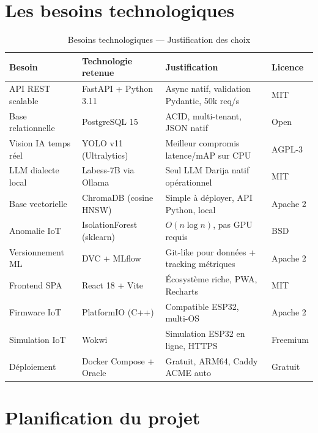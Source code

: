\section{Les besoins technologiques}

\begin{table}[H]\centering
\caption{Besoins technologiques — Justification des choix}
\label{tab:tech_needs}
\small
\begin{tabular}{lp{3.5cm}p{4cm}l}
\toprule
\textbf{Besoin} & \textbf{Technologie retenue} & \textbf{Justification} & \textbf{Licence} \\
\midrule
API REST scalable    & FastAPI + Python 3.11   & Async natif, validation Pydantic, 50k req/s & MIT \\
Base relationnelle   & PostgreSQL 15           & ACID, multi-tenant, JSON natif & Open \\
Vision IA temps réel & YOLO v11 (Ultralytics)  & Meilleur compromis latence/mAP sur CPU & AGPL-3 \\
LLM dialecte local   & Labess-7B via Ollama    & Seul LLM Darija natif opérationnel & MIT \\
Base vectorielle     & ChromaDB (cosine HNSW)  & Simple à déployer, API Python, local & Apache 2 \\
Anomalie IoT         & IsolationForest (sklearn)& $O(n \log n)$, pas GPU requis & BSD \\
Versionnement ML     & DVC + MLflow            & Git-like pour données + tracking métriques & Apache 2 \\
Frontend SPA         & React 18 + Vite         & Écosystème riche, PWA, Recharts & MIT \\
Firmware IoT         & PlatformIO (C++)        & Compatible ESP32, multi-OS & Apache 2 \\
Simulation IoT       & Wokwi                   & Simulation ESP32 en ligne, HTTPS & Freemium \\
Déploiement          & Docker Compose + Oracle & Gratuit, ARM64, Caddy ACME auto & Gratuit \\
\bottomrule
\end{tabular}
\end{table}

\section{Planification du projet}

